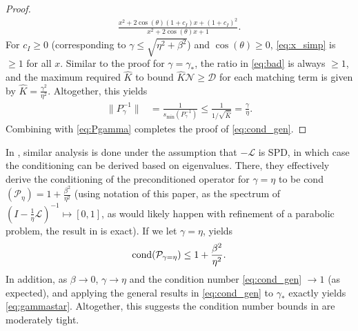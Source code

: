 \documentclass[review]{siamart}
\begin{document}
\begin{proof}
%
\begin{align}\label{eq:x_simp}
\frac{x^2 + 2\cos(\theta)(1+c_I)x + (1+c_I)^2}{x^2 + 2\cos(\theta)x + 1}.
\end{align}
%
For $c_I\geq 0$ (corresponding to $\gamma \leq\sqrt{\eta^2+\beta^2}$)
and $\cos(\theta)\geq 0$, \eqref{eq:x_simp} is $\geq 1$ for all $x$.
%
Similar to the proof for $\gamma = \gamma_*$, the ratio in \eqref{eq:bad}
is always $\geq 1$, and the maximum required $\widehat{K}$ to bound
$\widehat{K}\mathcal{N} \geq \mathcal{D}$ for each matching term is
given by $\widehat{K} = \tfrac{\gamma^2}{\eta^2}$. Altogether,
this yields
%
\begin{align*}
\|P_{\gamma}^{-1}\| & = \frac{1}{s_{\min}(P_{\gamma}^{-1})} 
	\leq \frac{1}{1/\sqrt{\widehat{K}}} 
	= \frac{\gamma}{\eta}.
\end{align*}
%
Combining with \eqref{eq:Pgamma} completes the proof of \eqref{eq:cond_gen}.
\end{proof}
%

In \cite{exh}, similar analysis is done under the assumption
that $-\mathcal{L}$ is SPD, in which case the conditioning can be derived based on
eigenvalues. There, they effectively derive the conditioning of the preconditioned
operator for $\gamma = \eta$ to be cond$(\mathcal{P}_\eta) = 1 + \tfrac{\beta^2}{\eta^2}$
(using notation of this paper, as the spectrum of $(I - \tfrac{1}{\eta}\mathcal{L})^{-1}
\mapsto [0,1]$, as would likely happen with refinement of a parabolic problem,
the result in \cite{exh} is exact). If we let $\gamma = \eta$,  yields
%
\begin{align}\label{eq:cond_eta}
\textnormal{cond}(\mathcal{P}_{\gamma = \eta}) \leq 1 + \frac{\beta^2}{\eta^2}.
\end{align}
%
In addition, as $\beta \to 0$, $\gamma \to \eta$ and the condition number
\eqref{eq:cond_gen} $\to 1$ (as expected), and applying the general results
in \eqref{eq:cond_gen} to $\gamma_*$ exactly yields \eqref{eq:gammastar}.
Altogether, this suggests the condition number bounds in 
are moderately tight.
\end{document}
